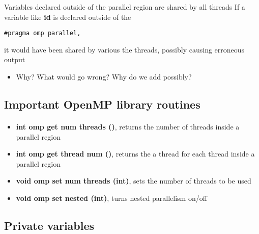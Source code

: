 \documentclass[%
oneside,                 %
final,                   %
10pt]{article}
\begin{document}
Variables declared outside of the parallel region are shared by all threads
If a variable like \textbf{id} is  declared outside of the 


\begin{verbatim}
#pragma omp parallel, 

\end{verbatim}

it would have been shared by various the threads, possibly causing erroneous output
\begin{itemize}
 \item Why? What would go wrong? Why do we add  possibly?
\end{itemize}

\noindent



\subsection*{Important OpenMP library routines}

\paragraph{}

\begin{itemize}
\item \textbf{int omp get num threads ()}, returns the number of threads inside a parallel region

\item \textbf{int omp get thread num ()},  returns the  a thread for each thread inside a parallel region

\item \textbf{void omp set num threads (int)}, sets the number of threads to be used

\item \textbf{void omp set nested (int)},  turns nested parallelism on/off
\end{itemize}

\noindent



\subsection*{Private variables}
\end{document}
